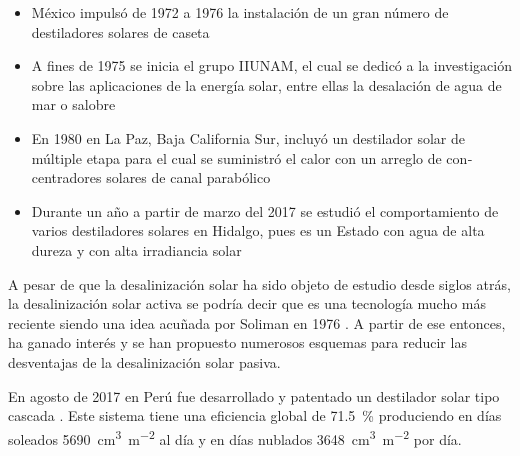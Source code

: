 			\begin{tcolorbox}[
				title={Breve historia de la destilación solar en México \cite{munoz_gutierrez_sobre_nodate}},
				colback=white,
				colframe=lilac,
				coltitle=black
			]
				\begin{itemize}
					\item México impulsó de 1972 a 1976 la instalación de un gran número de destiladores solares de caseta
					\item A fines de 1975 se inicia el grupo IIUNAM, el cual se dedicó a la investigación sobre las aplicaciones de la energía solar, entre ellas la desalación de agua de mar o salobre
					\item En 1980 en La Paz, Baja California Sur, incluyó un destilador solar de múltiple etapa para el cual se suministró el calor con un arreglo de con­centradores solares de canal parabólico
					\item Durante un año a partir de marzo del 2017 se estudió el comportamiento de varios destiladores solares en Hidalgo, pues es un Estado con agua de alta dureza y con alta irradiancia solar
				\end{itemize}
			\end{tcolorbox}
		
		
			A pesar de que la desalinización solar ha sido objeto de estudio desde siglos atrás, la desalinización solar activa se podría decir que es una tecnología mucho más reciente siendo una idea acuñada por Soliman en 1976 \cite[29]{zheng_solar_2017}. A partir de ese entonces, ha ganado interés y se han propuesto numerosos esquemas para reducir las desventajas de la desalinización solar pasiva.
			
			En agosto de 2017 en Perú fue desarrollado y patentado un destilador solar tipo cascada \cite{saettone_preliminary_2017}. Este sistema tiene una eficiencia global de \qty{71.5}{\percent} produciendo en días soleados \SI[sticky-per]{5690}{\cm\tothe{3}\per\m\tothe{2}} al día y en días nublados \SI[sticky-per]{3648}{\cm\tothe{3}\per\m\tothe{2}} por día.
			
		
%		
